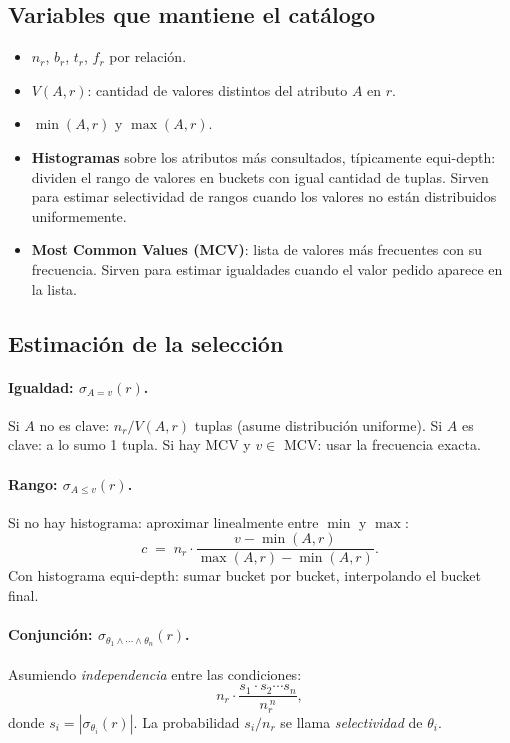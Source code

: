 \documentclass[11pt,a4paper]{article}
\newcommand{\sel}[1]{\sigma_{#1}}
\begin{document}
\subsection{Variables que mantiene el catálogo}

\begin{itemize}
    \item $n_r$, $b_r$, $t_r$, $f_r$ por relación.
    \item $V(A,r)$: cantidad de valores distintos del atributo $A$ en $r$.
    \item $\min(A,r)$ y $\max(A,r)$.
    \item \textbf{Histogramas} sobre los atributos más consultados,
    típicamente equi-depth: dividen el rango de valores en buckets con
    igual cantidad de tuplas. Sirven para estimar selectividad de rangos
    cuando los valores no están distribuidos uniformemente.
    \item \textbf{Most Common Values (MCV)}: lista de valores más
    frecuentes con su frecuencia. Sirven para estimar igualdades cuando
    el valor pedido aparece en la lista.
\end{itemize}

\subsection{Estimación de la selección}

\paragraph{Igualdad: $\sel{A=v}(r)$.}
Si $A$ no es clave: $n_r / V(A,r)$ tuplas (asume distribución uniforme).
Si $A$ es clave: a lo sumo 1 tupla.
Si hay MCV y $v \in$ MCV: usar la frecuencia exacta.

\paragraph{Rango: $\sel{A\le v}(r)$.}
Si no hay histograma: aproximar linealmente entre $\min$ y $\max$:
\[
c \;=\; n_r \cdot \frac{v - \min(A,r)}{\max(A,r) - \min(A,r)}.
\]
Con histograma equi-depth: sumar bucket por bucket, interpolando el
bucket final.

\paragraph{Conjunción: $\sel{\theta_1\wedge\cdots\wedge\theta_n}(r)$.}
Asumiendo \emph{independencia} entre las condiciones:
\[
n_r \cdot \frac{s_1 \cdot s_2 \cdots s_n}{n_r^{\,n}},
\]
donde $s_i = |\sel{\theta_i}(r)|$. La probabilidad $s_i / n_r$ se llama
\emph{selectividad} de $\theta_i$.
\end{document}
